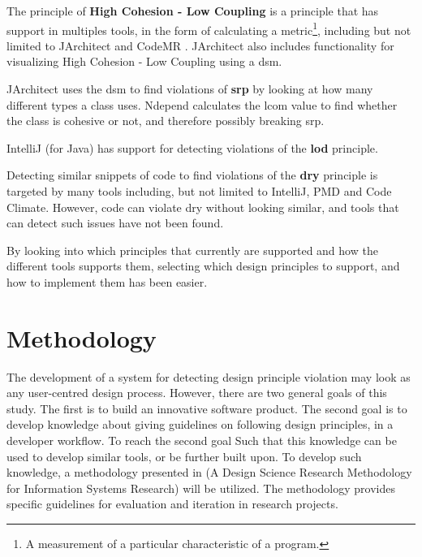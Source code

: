 \documentclass{report}
\begin{document}
The principle of \textbf{High Cohesion - Low Coupling} is a principle that has support in multiples tools, in the form of calculating a metric\footnote{A measurement of a particular characteristic of a program.}, including but not limited to JArchitect \cite{jarchitect} and CodeMR \cite{codemr}. JArchitect \cite{jarchitect} also includes functionality for visualizing  High Cohesion - Low Coupling using a \gls{dsm}. 

JArchitect uses the \gls{dsm} to find violations of \textbf{\gls{srp}} by looking at how many different types a class uses. Ndepend \cite{ndepend} calculates the \gls{lcom} value to find whether the class is cohesive or not, and therefore possibly breaking \gls{srp}. 

IntelliJ \cite{IntelliJ} (for Java) has support for detecting violations of the \textbf{\gls{lod}} principle.

Detecting similar snippets of code to find violations of the \textbf{\gls{dry}} principle is targeted by many tools including, but not limited to IntelliJ, PMD and Code Climate. However, code can violate \gls{dry} without looking similar, and tools that can detect such issues have not been found.  

By looking into which principles that currently are supported and how the different tools supports them,  selecting which design principles to support, and how to implement them has been easier.









\chapter{Methodology}
\label{methodology}
The development of a system for detecting design principle violation may look as any user-centred design process. However, there are two general goals of this study. The first is to build an innovative software product. The second goal is to develop knowledge about giving guidelines on following design principles, in a developer workflow. To reach the second goal  Such that this knowledge can be used to develop similar tools, or be further built upon. To develop such knowledge, a methodology presented in (A Design Science Research Methodology for Information Systems Research) \cite{10.2753/MIS0742-1222240302} will be utilized. The methodology provides specific guidelines for evaluation and iteration in research projects. 
\end{document}
